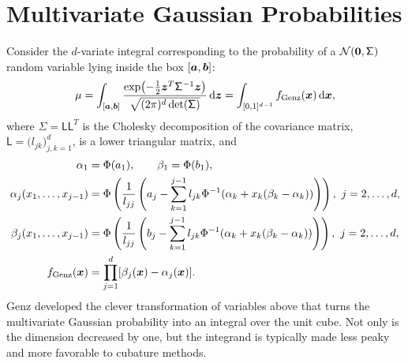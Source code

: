 \documentclass[graybox,footinfo]{svmult}
\begin{document}
\section{Multivariate Gaussian Probabilities} \label{FJH:sec:Gauss}
Consider the $d$-variate integral corresponding to the probability of a 
${\mathcal{N}}({\boldsymbol{0}},\mathsf{\Sigma})$ random variable lying inside the box $[{\boldsymbol{a}},{\boldsymbol{b}}]$:
\begin{equation} \label{FJH:eq:MVN}
\mu = \int_{[\bsa,\bsb]} \frac{\exp\bigl(- \frac 12 \bsz^T \mathsf{\Sigma}^{-1} \bsz 
\bigr)}{\sqrt{(2 \pi)^d \det(\mathsf{\Sigma})}} \, \D \bsz = \int_{[0,1]^{d-1}} 
f_{\textup{Genz}}(\bsx) \, \D 
\bsx,
\end{equation}
where $\mathsf{\Sigma} = \mathsf{L}\mathsf{L}^T$ is the Cholesky decomposition of 
the covariance matrix, $\mathsf{L} = \bigl(l_{jk}\bigr)_{j,k=1}^d$, is a lower triangular 
matrix, and
\begin{align}
\nonumber
\alpha_1 & = \Phi(a_1), \qquad \beta_1  = \Phi(b_1), \\
\nonumber
\alpha_j(x_1, \ldots, x_{j-1}) &= \Phi\left(\frac{1}{l_{jj}} \left(a_j - \sum_{k=1}^{j-1} 
l_{jk}\Phi^{-1}(\alpha_k + x_k(\beta_k-\alpha_k))\right)\right), \ j =2, \ldots, d,\\
\nonumber
\beta_j(x_1, \ldots, x_{j-1}) &= \Phi\left(\frac{1}{l_{jj}} \left(b_j - \sum_{k=1}^{j-1} 
l_{jk}\Phi^{-1}(\alpha_k + x_k(\beta_k-\alpha_k))\right)\right), \ j =2, \ldots, d, \\
f_{\textup{Genz}}(\bsx) &= \prod_{j=1}^{d} [\beta_j(\bsx) - \alpha_j(\bsx)]. 
\label{FJH:eq:Genz}
\end{align}
Genz \cite{Gen93} developed the clever transformation of variables above that turns the 
multivariate Gaussian probability into an integral over the unit cube.  Not only is the 
dimension decreased by one, but the integrand is typically made less peaky and more 
favorable to cubature methods.
\end{document}
